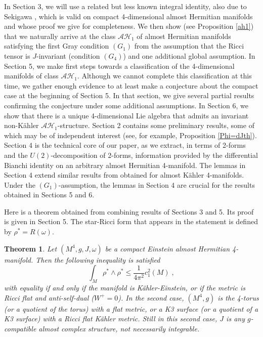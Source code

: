 \documentclass{amsart}
\newtheorem{theorem}{Theorem}[section]
\begin{document}
In Section 3, we will use a related but less known integral identity, also due to Sekigawa \cite{Sek87}, which is valid on compact 4-dimensional almost Hermitian manifolds and whose proof we give for completeness. We then show (see Proposition \ref{ah1}) that we naturally arrive at the class $\mathcal{AH}_{1}$ of almost Hermitian manifolds satisfying the first Gray condition $(G_1)$ from the assumption that the Ricci tensor is $J$-invariant (condition $(G_4)$) and one additional global assumption. In Section 5, we make first steps towards a classification of the 4-dimensional manifolds of class $\mathcal{AH}_{1}$. Although we cannot complete this classification at this time, we gather enough evidence to at least make a conjecture about the compact case at the beginning of Section 5. In that section, we give several partial results confirming the conjecture under some additional assumptions. In Section 6, we show that there is a unique 4-dimensional Lie algebra that admits an invariant non-K\"ahler $\mathcal{AH}_{1}$-structure. Section 2 contains some preliminary results, some of which may be of independent interest (see, for example, Proposition \ref{Phi=dJth}). Section 4 is the technical core of our paper, as we extract, in terms of 2-forms and the $U(2)$-decomposition of 2-forms, information provided by the differential Bianchi identity on an arbitrary almost Hermitian 4-manifold. The lemmas in Section 4 extend similar results from \cite{AAD} obtained for almost K\"ahler 4-manifolds.
Under the $(G_1)$-assumption, the lemmas in Section 4 are crucial for the results obtained in Sections 5 and 6. 






\vspace{0.2cm}




\noindent
Here is a theorem obtained from combining results of Sections 3 and 5. Its proof is given in Section 5. The star-Ricci form that appears in the statement is defined by $\rho^* = R(\omega)$.

\begin{theorem} \label{Eah1}
Let $(M^4, g, J, \omega)$ be a compact Einstein almost Hermitian 4-manifold. Then the following inequality is satisfied
$$\int_M \rho^* \wedge \rho^* \leq \frac{1}{4\pi^2} c_1^2(M) \; ,$$ 
with equality if and only if the manifold is K\"ahler-Einstein, or if the metric is Ricci flat and anti-self-dual ($W^+ = 0$). In the second case, $(M^4, g)$ is the 4-torus (or a quotient of the torus) with a flat metric, or a K3 surface (or a quotient of a K3 surface) with a Ricci flat K\"ahler metric. Still in this second case, $J$ is any $g$-compatible almost complex structure, not necessarily integrable.
\end{theorem}
\end{document}

